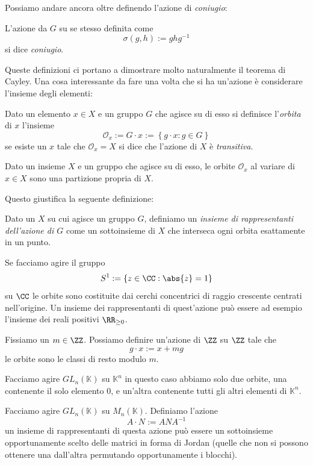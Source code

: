\documentclass[11pt]{scrartcl}
\begin{document}
	Possiamo andare ancora oltre definendo l'azione di \textit{coniugio}:
	\begin{definition}[Coniugio]
		L'azione da $G$ su se stesso definita come
		$$\sigma(g,h):=ghg^{-1}$$
		si dice \textit{coniugio}.
	\end{definition}
	Queste definizioni ci portano a dimostrare molto naturalmente il teorema di Cayley. Una cosa interessante da fare una volta che si ha un'azione è considerare l'insieme degli elementi:
	\begin{definition}[Orbita]
		Dato un elemento $x\in X$ e un gruppo $G$ che agisce su di esso si definisce l'\textit{orbita} di $x$ l'insieme
		$$\mathcal{O}_x:=G\cdot x := \left\{g\cdot x:g\in G\right\}$$
		se esiste un $x$ tale che $\mathcal{O}_x=X$ si dice che l'azione di $X$ è \textit{transitiva}.
	\end{definition}
	\begin{lemma}
		Dato un insieme $X$ e un gruppo che agisce su di esso, le orbite $\mathcal{O}_x$ al variare di $x\in X$ sono una partizione propria di $X$.
	\end{lemma}
	Questo giustifica la seguente definizione:
	\begin{definition}
		Dato un $X$ su cui agisce un gruppo $G$, definiamo un \textit{insieme di rappresentanti dell'azione di $G$} come un sottoinsieme di $X$ che interseca ogni orbita esattamente in un punto.
	\end{definition}
	\begin{example}
		Se facciamo agire il gruppo 
		$$S^1:=\left\{z\in \CC:\abs{z}=1\right\}$$
		su $\CC$ le orbite sono costituite dai cerchi concentrici di raggio crescente centrati nell'origine. Un insieme dei rappresentanti di quest'azione può essere ad esempio l'insieme dei reali positivi $\RR_{\ge 0}$.
	\end{example}
	\begin{example}
		Fissiamo un $m\in\ZZ$. Possiamo definire un'azione di $\ZZ$ su $\ZZ$ tale che 
		$$g\cdot x:= x+mg$$
		le orbite sono le classi di resto modulo $m$. 
	\end{example}
	\begin{example}
		Facciamo agire $GL_{n}(\mathbb{K})$ su $\mathbb{K}^n$ in questo caso abbiamo solo due orbite, una contenente il solo elemento $0$, e un'altra contenente tutti gli altri elementi di $\mathbb{K}^n$.
	\end{example}
	\begin{example}
		Facciamo agire $GL_n(\mathbb{K})$ su $M_n(\mathbb{K})$. Definiamo l'azione
		$$A\cdot N:=ANA^{-1} $$
		un insieme di rappresentanti di questa azione può essere un sottoinsieme opportunamente scelto delle matrici in forma di Jordan (quelle che non si possono ottenere una dall'altra permutando opportunamente i blocchi).
	\end{example}
\end{document}
